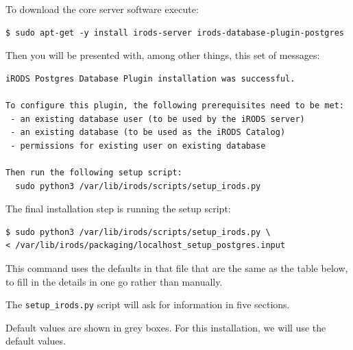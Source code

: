 \documentclass[10pt,oneside]{memoir}
\begin{document}
To download the core server software execute:

\begin{lstlisting}
$ sudo apt-get -y install irods-server irods-database-plugin-postgres
\end{lstlisting}

Then you will be presented with, among other things, this set of messages:

\begin{lstlisting}
iRODS Postgres Database Plugin installation was successful.

To configure this plugin, the following prerequisites need to be met:
 - an existing database user (to be used by the iRODS server)
 - an existing database (to be used as the iRODS Catalog)
 - permissions for existing user on existing database

Then run the following setup script:
  sudo python3 /var/lib/irods/scripts/setup_irods.py
\end{lstlisting}

The final installation step is running the setup script:

\begin{lstlisting}
$ sudo python3 /var/lib/irods/scripts/setup_irods.py \
< /var/lib/irods/packaging/localhost_setup_postgres.input
\end{lstlisting}

This command uses the defaults in that file that are the same as the table below, to fill in the details in one go rather than manually. 

\newpage
The \texttt{setup\_irods.py} script will ask for information in five sections.

Default values are shown in grey boxes.  For this installation, we will use the default values.
\end{document}
